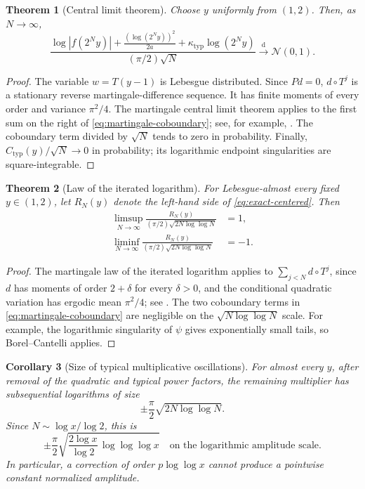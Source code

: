 \documentclass[11pt,oneside]{article}
\newtheorem{theorem}{Theorem}[section]
\newtheorem{corollary}[theorem]{Corollary}
\theoremstyle{definition}
\theoremstyle{remark}
\newcommand{\dist}{\mathop{\longrightarrow}\limits^{\mathrm d}}
\newcommand{\T}{T}
\begin{document}
\begin{theorem}[Central limit theorem]
Choose $y$ uniformly from $(1,2)$.  Then, as $N\to\infty$,
\begin{equation}
 \frac{
 \log|f(2^Ny)|+
\frac{(\log(2^Ny))^2}{2a}
 +\kappa_{\mathrm{typ}}\log(2^Ny)
 }{(\pi/2)\sqrt N}
 \dist \mathcal N(0,1).                                    \label{eq:clt}
\end{equation}
\end{theorem}

\begin{proof}
The variable $w=\T(y-1)$ is Lebesgue distributed.  Since $Pd=0$,
$d\circ\T^j$ is a stationary reverse martingale-difference sequence.  It has
finite moments of every order and variance $\pi^2/4$.  The martingale central
limit theorem applies to the first sum on the right of
\eqref{eq:martingale-coboundary}; see, for example, \cite{hallheyde}.  The
coboundary term divided by $\sqrt N$ tends to zero in probability.  Finally,
$C_{\mathrm{typ}}(y)/\sqrt N\to0$ in probability; its logarithmic endpoint
singularities are square-integrable.
\end{proof}

\begin{theorem}[Law of the iterated logarithm]
For Lebesgue-almost every fixed $y\in(1,2)$, let $R_N(y)$ denote the left-hand
side of \eqref{eq:exact-centered}.  Then
\begin{align}
 \limsup_{N\to\infty}
 \frac{R_N(y)}{(\pi/2)\sqrt{2N\log\log N}}&=1,             \label{eq:lil-plus}\\
 \liminf_{N\to\infty}
 \frac{R_N(y)}{(\pi/2)\sqrt{2N\log\log N}}&=-1.           \label{eq:lil-minus}
\end{align}
\end{theorem}

\begin{proof}
The martingale law of the iterated logarithm applies to
$\sum_{j<N}d\circ\T^j$, since $d$ has moments of order $2+\delta$ for every
$\delta>0$, and the conditional quadratic variation has ergodic mean
$\pi^2/4$; see \cite{stout1970}.  The two coboundary terms in
\eqref{eq:martingale-coboundary} are negligible on the
$\sqrt{N\log\log N}$ scale.  For example, the logarithmic singularity of
$\psi$ gives exponentially small tails, so Borel--Cantelli applies.
\end{proof}

\begin{corollary}[Size of typical multiplicative oscillations]
For almost every $y$, after removal of the quadratic and typical power factors,
the remaining multiplier has subsequential logarithms of size
\begin{equation}
 \pm\frac{\pi}{2}\sqrt{2N\log\log N}.
\end{equation}
Since $N\sim\log x/\log2$, this is
\begin{equation}
 \pm\frac{\pi}{2}
 \sqrt{\frac{2\log x}{\log2}\,\log\log\log x}
 \quad\text{on the logarithmic amplitude scale}.           \label{eq:x-lil-scale}
\end{equation}
In particular, a correction of order $p\log\log x$ cannot produce a pointwise
constant normalized amplitude.
\end{corollary}
\end{document}

